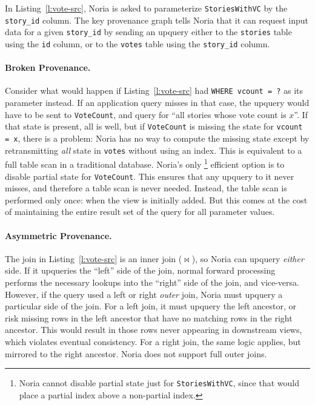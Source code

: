 In Listing~\ref{l:vote-src}, Noria is asked to parameterize
\texttt{StoriesWithVC} by the \texttt{story\_id} column. The key provenance
graph tells Noria that it can request input data for a given \texttt{story\_id}
by sending an upquery either to the \texttt{stories} table using the \texttt{id}
column, or to the \texttt{votes} table using the \texttt{story\_id} column.

\paragraph{Broken Provenance.}
Consider what would happen if Listing~\ref{l:vote-src} had \texttt{WHERE vcount
= ?} as its parameter instead. If an application query misses in that case, the
upquery would have to be sent to \texttt{VoteCount}, and query for ``all stories
whose vote count is $x$''. If that state is present, all is well, but if
\texttt{VoteCount} is missing the state for \texttt{vcount = x}, there is a
problem: Noria has no way to compute the missing state except by retransmitting
\emph{all} state in \texttt{votes} without using an index. This is equivalent to
a full table scan in a traditional database. Noria's only%
%
\footnote{Noria cannot disable partial state just for \texttt{StoriesWithVC},
since that would place a partial index above a non-partial index.}
%
efficient option is to disable partial
state for \texttt{VoteCount}. This ensures that any upquery to it never misses,
and therefore a table scan is never needed. Instead, the table scan is performed
only once: when the view is initially added. But this comes at the cost of
maintaining the entire result set of the query for all parameter values.

\paragraph{Asymmetric Provenance.}
The join in Listing~\ref{l:vote-src} is an inner join ($\bowtie$), so Noria can
upquery \emph{either} side. If it upqueries the ``left'' side of the join,
normal forward processing performs the necessary lookups into the ``right'' side
of the join, and vice-versa. However, if the query used a left or right
\emph{outer} join, Noria must upquery a particular side of the join. For a left
join, it must upquery the left ancestor, or risk missing rows in the left
ancestor that have no matching rows in the right ancestor. This would result in
those rows never appearing in downstream views, which violates eventual
consistency. For a right join, the same logic applies, but mirrored to the right
ancestor. Noria does not support full outer joins.

